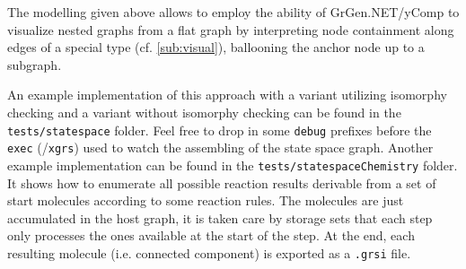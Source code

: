 The modelling given above allows to employ the ability of GrGen.NET/yComp to visualize nested graphs from a flat graph by interpreting node containment along edges of a special type (cf. \ref{sub:visual}), ballooning the anchor node up to a subgraph. 

An example implementation of this approach with a variant utilizing isomorphy checking and a variant without isomorphy checking can be found in the \texttt{tests/statespace} folder.
Feel free to drop in some \texttt{debug} prefixes before the \texttt{exec} (/\texttt{xgrs}) used to watch the assembling of the state space graph.
Another example implementation can be found in the \texttt{tests/statespaceChemistry} folder.
It shows how to enumerate all possible reaction results derivable from a set of start molecules according to some reaction rules.
The molecules are just accumulated in the host graph, it is taken care by storage sets that each step only processes the ones available at the start of the step.
At the end, each resulting molecule (i.e. connected component) is exported as a \texttt{.grsi} file.


